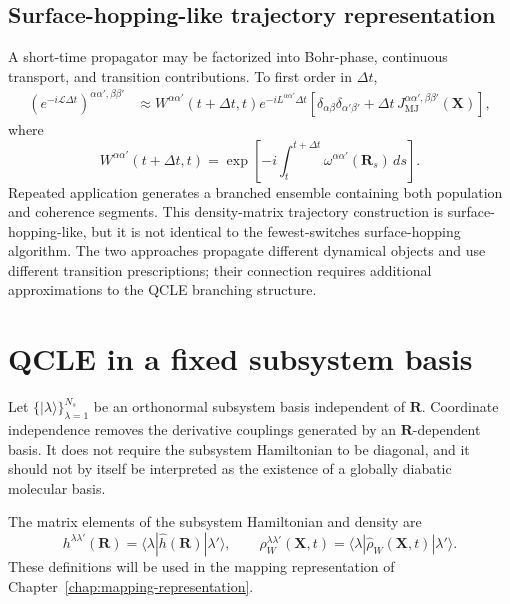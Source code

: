 \documentclass[
  11pt,
  letterpaper,
  onehalfspacing,
  normalmargins,
  equalmargins,
  oneside
]{ut-thesis}
\begin{document}
\subsection{Surface-hopping-like trajectory representation}
\label{subsec:qcle-surface-hopping-connection}

A short-time propagator may be factorized into Bohr-phase, continuous
transport, and transition contributions. To first order in \(\Delta t\),
\begin{align}
\left(
 e^{-i\mathcal L\Delta t}
\right)^{\alpha\alpha',\beta\beta'}
&\approx
W^{\alpha\alpha'}(t+\Delta t,t)
 e^{-iL^{\alpha\alpha'}\Delta t}
\left[
\delta_{\alpha\beta}\delta_{\alpha'\beta'}
+
\Delta t\,
J_{\mathrm{MJ}}^{\alpha\alpha',\beta\beta'}(\mathbf X)
\right],
\label{eq:qcle-short-time-propagator}
\end{align}
where
\begin{equation}
W^{\alpha\alpha'}(t+\Delta t,t)
=
\exp\left[
-i
\int_t^{t+\Delta t}
\omega^{\alpha\alpha'}(\mathbf R_s)\,ds
\right].
\label{eq:qcle-bohr-phase-factor}
\end{equation}
Repeated application generates a branched ensemble containing both population
and coherence segments. This density-matrix trajectory construction is
surface-hopping-like, but it is not identical to the fewest-switches
surface-hopping algorithm. The two approaches propagate different dynamical
objects and use different transition prescriptions; their connection requires
additional approximations to the QCLE branching structure.


\section{QCLE in a fixed subsystem basis}
\label{sec:subsystem-basis-qcle}

Let \(\{|\lambda\rangle\}_{\lambda=1}^{N_s}\) be an orthonormal subsystem
basis independent of \(\mathbf R\). Coordinate independence removes the
derivative couplings generated by an \(\mathbf R\)-dependent basis. It does
not require the subsystem Hamiltonian to be diagonal, and it should not by
itself be interpreted as the existence of a globally diabatic molecular
basis.

The matrix elements of the subsystem Hamiltonian and density are
\begin{equation}
h^{\lambda\lambda'}(\mathbf R)
=
\langle\lambda|
\hat h(\mathbf R)
|\lambda'\rangle,
\qquad
\rho_W^{\lambda\lambda'}(\mathbf X,t)
=
\langle\lambda|
\hat\rho_W(\mathbf X,t)
|\lambda'\rangle.
\label{eq:fixed-basis-hamiltonian-density-elements}
\end{equation}
These definitions will be used in the mapping representation of
Chapter~\ref{chap:mapping-representation}.
\end{document}
